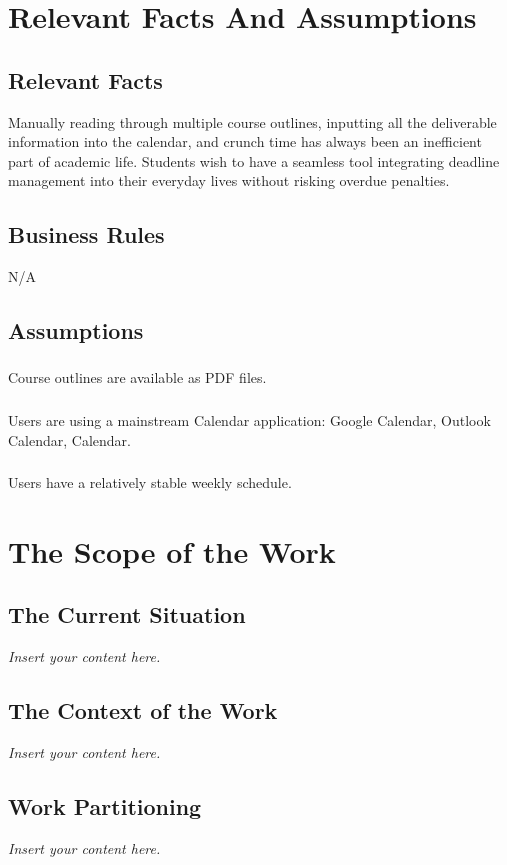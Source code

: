 \documentclass[12pt]{article}
\newcommand{\lips}{\textit{Insert your content here.}}
\begin{document}
\section{Relevant Facts And Assumptions}
\subsection{Relevant Facts}
Manually reading through multiple course outlines, inputting all the deliverable information into the calendar, and crunch time has always been an inefficient part of academic life. Students wish to have a seamless tool integrating deadline management into their everyday lives without risking overdue penalties.
\subsection{Business Rules}
N/A
\subsection{Assumptions}
\subsubsection{}
Course outlines are available as PDF files.
\subsubsection{}
Users are using a mainstream Calendar application: Google Calendar, Outlook Calendar, Calendar.
\subsubsection{}
Users have a relatively stable weekly schedule.

\section{The Scope of the Work}
\subsection{The Current Situation}
\lips
\subsection{The Context of the Work}
\lips
\subsection{Work Partitioning}
\lips
\end{document}
